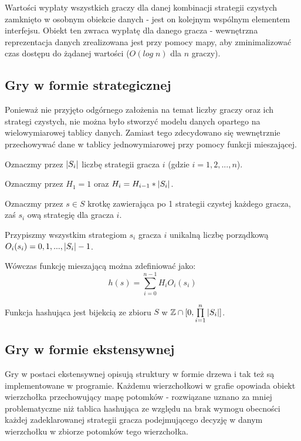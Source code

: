 \documentclass{standalone}
\begin{document}
Wartości wypłaty wszystkich graczy dla danej kombinacji strategii czystych zamknięto w osobnym obiekcie
danych - jest on kolejnym wspólnym elementem interfejsu. Obiekt ten zwraca wypłatę dla danego gracza -
wewnętrzna reprezentacja danych zrealizowana jest przy pomocy mapy, aby zminimalizować czas dostępu do
żądanej wartości ($O(log\;n)$ dla $n$ graczy).

\subsection{Gry w formie strategicznej}

Ponieważ nie przyjęto odgórnego założenia na temat liczby graczy oraz ich strategi czystych, nie można było
stworzyć modelu danych opartego na wielowymiarowej tablicy danych. Zamiast tego zdecydowano się wewnętrznie
przechowywać dane w tablicy jednowymiarowej przy pomocy funkcji mieszającej.

Oznaczmy przez $|S_i|$ liczbę strategii gracza $i$ (gdzie $i = 1, 2, ..., n$).

Oznaczmy przez $H_1 = 1$ oraz $H_i = H_{i-1} * |S_i|$.

Oznaczmy przez $s \in S$ krotkę zawierająca po 1 strategii czystej każdego gracza, zaś $s_i$ ową strategię
dla gracza $i$.

Przypiszmy wszystkim strategiom $s_i$ gracza $i$ unikalną liczbę porządkową $O_i(s_i) = 0, 1, ..., |S_i|-1$.

Wówczas funkcję mieszającą można zdefiniować jako:
$$h(s) = \sum\limits_{i=0}^{n-1} H_i O_i(s_i)$$

\begin{theorem}
Funkcja hashująca jest bijekcią ze zbioru $S$ w $ \mathbb{Z} \cap [0, \prod\limits_{i=1}^{n} |S_i|] $.
\end{theorem}



\subsection{Gry w formie ekstensywnej}

Gry w postaci ekstensywnej opisują struktury w formie drzewa i tak też są implementowane w programie. Każdemu
wierzchołkowi w grafie opowiada obiekt wierzchołka przechowujący mapę potomków - rozwiązane uznano za mniej problematyczne
niż tablica hashująca ze względu na brak wymogu obecności każdej zadeklarowanej strategii gracza podejmującego decyzję w danym
wierzchołku w zbiorze potomków tego wierzchołka.
\end{document}
